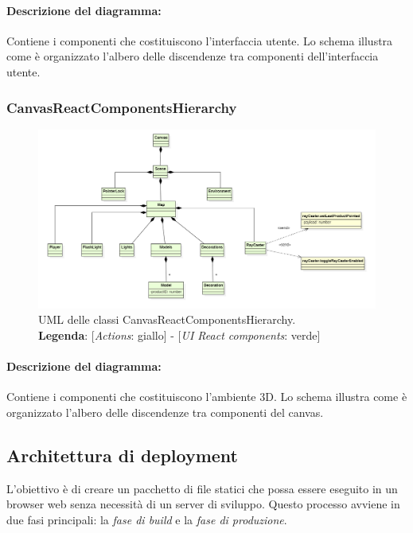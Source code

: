 \paragraph*{Descrizione del diagramma:}
Contiene i componenti che costituiscono l'interfaccia utente.
Lo schema illustra come è organizzato l'albero delle discendenze tra componenti dell'interfaccia utente.
\begin{landscape}
\thispagestyle{empty}
\subsubsection{CanvasReactComponentsHierarchy}
\begin{figure}[H]
	\centering
	\includegraphics[scale=0.7 , keepaspectratio]{./res/images/canvasReactComponentsHierarchy.PNG}
	\caption[UML delle classi CanvasReactComponentsHierarchy]{
	UML delle classi CanvasReactComponentsHierarchy.
	\\
	\textbf{Legenda}: 
	[\textit{Actions}: giallo] -
	[\textit{UI React components}: verde]}
\end{figure}
\end{landscape}
\restoregeometry

\paragraph*{Descrizione del diagramma:}
Contiene i componenti che costituiscono l'ambiente 3D.
Lo schema illustra come è organizzato l'albero delle discendenze tra componenti del canvas.

\subsection{Architettura di deployment}
L'obiettivo è di creare un pacchetto di file statici che possa essere eseguito in un browser web senza necessità di un server di sviluppo.
Questo processo avviene in due fasi principali: la \textit{fase di build} e la \textit{fase di produzione}.
